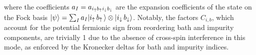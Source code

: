 \documentclass[edipack_sp.tex]{subfiles}
\begin{document}
where the coefficients $a_I = a_{i_\uparrow b_\uparrow i_\downarrow b_\downarrow}$ are the
expansion coefficients of the state on the Fock basis
$|\psi\rangle = \sum_I a_I |i_\uparrow\,  b_\uparrow\,\rangle \otimes |i_\downarrow
  \, b_\downarrow\rangle$.
Notably, the factors $C_{i,b}$, which account for the potential 
fermionic sign from reordering bath and impurity components, are 
trivially 1 due to the absence of cross-spin interference in this 
mode, as enforced by the Kronecker deltas for bath and impurity 
indices.
\end{document}
